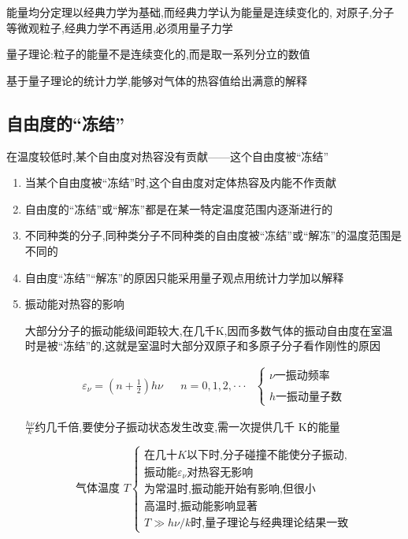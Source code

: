 \documentclass{article}
\begin{document}
能量均分定理以经典力学为基础,而经典力学认为能量是连续变化的,
对原子,分子等微观粒子,经典力学不再适用,必须用量子力学

量子理论:粒子的能量不是连续变化的,而是取一系列分立的数值

基于量子理论的统计力学,能够对气体的热容值给出满意的解释

\subsection{自由度的“冻结”}

在温度较低时,某个自由度对热容没有贡献——这个自由度被“冻结”

\begin{enumerate}
    \item 当某个自由度被“冻结”时,这个自由度对定体热容及内能不作贡献
    \item 自由度的“冻结”或“解冻”都是在某一特定温度范围内逐渐进行的
    \item 不同种类的分子,同种类分子不同种类的自由度被“冻结”或“解冻”的温度范围是不同的
    \item 自由度“冻结”“解冻”的原因只能采用量子观点用统计力学加以解释
    \vspace{1em}
    \item 振动能对热容的影响
    
    大部分分子的振动能级间距较大,在几千K,因而多数气体的振动自由度在室温时是被“冻结”的,这就是室温时大部分双原子和多原子分子看作刚性的原因

    $$\begin{aligned}\varepsilon_\nu=(n+\frac{1}{2})h\nu&&n=0,1,2,\cdotp\cdotp\cdotp&\left\{\begin{array}{c}\nu\text{一振动频率}\\\\h\text{一振动量子数}\end{array}\right.\end{aligned}$$
    
    $\frac{h\nu}{k}$约几千倍,要使分子振动状态发生改变,需一次提供几千 K的能量

$$
\text{气体温度 } T
\begin{cases}
\text{在几十} K \text{以下时,分子碰撞不能使分子振动,} \\
\text{振动能}\varepsilon_\nu\text{对热容无影响} \\[6pt]
\text{为常温时,振动能开始有影响,但很小} \\[6pt]
\text{高温时,振动能影响显著} \\[6pt]
T\gg h\nu/k\text{时,量子理论与经典理论结果一致}
\end{cases}
$$


\end{enumerate}
\end{document}
